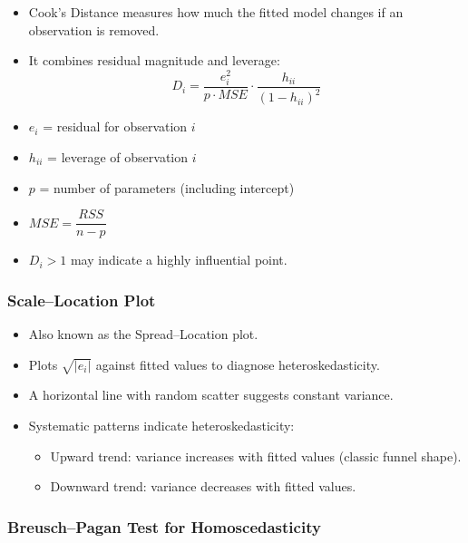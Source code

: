 \documentclass[10pt,a4paper]{article}
\begin{document}
	\begin{itemize}
	    \item Cook's Distance measures how much the fitted model changes if an observation is removed.
	    
	    \item It combines residual magnitude and leverage:
	    $$
	    D_i =
	    \frac{e_i^2}{p \cdot MSE}
	    \cdot
	    \frac{h_{ii}}{(1-h_{ii})^2}
	    $$
	    
	    \item $e_i$ = residual for observation $i$
	    
	    \item $h_{ii}$ = leverage of observation $i$
	    
	    \item $p$ = number of parameters (including intercept)
	    
	    \item $MSE = \dfrac{RSS}{n-p}$
	    
	    \item $D_i > 1$ may indicate a highly influential point.
	\end{itemize}

	\subsubsection{Scale--Location Plot}

	\begin{itemize}
		\item Also known as the Spread--Location plot.
		\item Plots $\sqrt{|e_i|}$ against fitted values to diagnose heteroskedasticity.
		\item A horizontal line with random scatter suggests constant variance.
		\item Systematic patterns indicate heteroskedasticity:
		\begin{itemize}
			\item Upward trend: variance increases with fitted values (classic funnel shape).
			\item Downward trend: variance decreases with fitted values.
		\end{itemize}
	\end{itemize}

	\subsubsection{Breusch--Pagan Test for Homoscedasticity}
\end{document}
